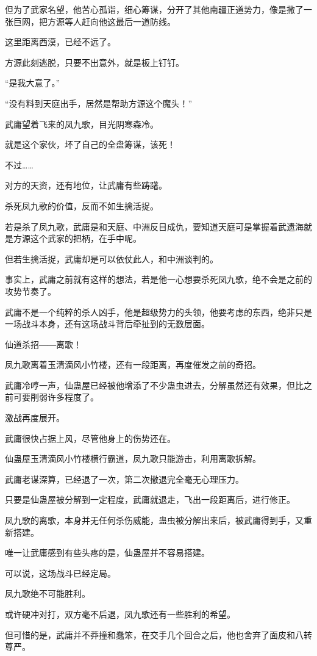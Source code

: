 \begin{this_body}
但为了武家名望，他苦心孤诣，细心筹谋，分开了其他南疆正道势力，像是撒了一张巨网，把方源等人赶向他这最后一道防线。

这里距离西漠，已经不远了。

方源此刻逃脱，只要不出意外，就是板上钉钉。

“是我大意了。”

“没有料到天庭出手，居然是帮助方源这个魔头！”

武庸望着飞来的凤九歌，目光阴寒森冷。

就是这个家伙，坏了自己的全盘筹谋，该死！

不过……

对方的天资，还有地位，让武庸有些踌躇。

杀死凤九歌的价值，反而不如生擒活捉。

若是杀了凤九歌，武庸是和天庭、中洲反目成仇，要知道天庭可是掌握着武遗海就是方源这个武家的把柄，在手中呢。

但若生擒活捉，武庸却是可以依仗此人，和中洲谈判的。

事实上，武庸之前就有这样的想法，若是他一心想要杀死凤九歌，绝不会是之前的攻势节奏了。

武庸不是一个纯粹的杀人凶手，他是超级势力的头领，他要考虑的东西，绝非只是一场战斗本身，还有这场战斗背后牵扯到的无数层面。

仙道杀招――离歌！

凤九歌离着玉清滴风小竹楼，还有一段距离，再度催发之前的奇招。

武庸冷哼一声，仙蛊屋已经被他增添了不少蛊虫进去，分解虽然还有效果，但比之前可要削弱许多程度了。

激战再度展开。

武庸很快占据上风，尽管他身上的伤势还在。

仙蛊屋玉清滴风小竹楼横行霸道，凤九歌只能游击，利用离歌拆解。

武庸老谋深算，已经退了一次，第二次撤退完全毫无心理压力。

只要是仙蛊屋被分解到一定程度，武庸就退走，飞出一段距离后，进行修正。

凤九歌的离歌，本身并无任何杀伤威能，蛊虫被分解出来后，被武庸得到手，又重新搭建。

唯一让武庸感到有些头疼的是，仙蛊屋并不容易搭建。

可以说，这场战斗已经定局。

凤九歌绝不可能胜利。

或许硬冲对打，双方毫不后退，凤九歌还有一些胜利的希望。

但可惜的是，武庸并不莽撞和蠢笨，在交手几个回合之后，他也舍弃了面皮和八转尊严。


\end{this_body}

